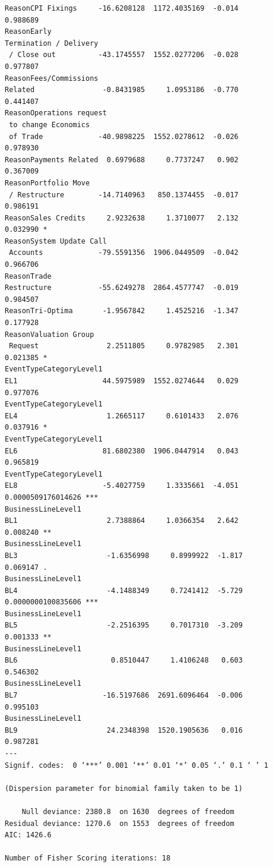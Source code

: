 \documentclass{DissertateUSU}
\begin{document}
\begin{verbatim}
ReasonCPI Fixings     -16.6208128  1172.4035169  -0.014           0.988689    
ReasonEarly 
Termination / Delivery
 / Close out          -43.1745557  1552.0277206  -0.028           0.977807    
ReasonFees/Commissions
Related                -0.8431985     1.0953186  -0.770           0.441407    
ReasonOperations request
 to change Economics
 of Trade             -40.9898225  1552.0278612  -0.026           0.978930    
ReasonPayments Related  0.6979688     0.7737247   0.902           0.367009    
ReasonPortfolio Move
 / Restructure        -14.7140963   850.1374455  -0.017           0.986191    
ReasonSales Credits     2.9232638     1.3710077   2.132           0.032990 *  
ReasonSystem Update Call
 Accounts             -79.5591356  1906.0449509  -0.042           0.966706    
ReasonTrade 
Restructure           -55.6249278  2864.4577747  -0.019           0.984507    
ReasonTri-Optima       -1.9567842     1.4525216  -1.347           0.177928    
ReasonValuation Group
 Request                2.2511805     0.9782985   2.301           0.021385 *  
EventTypeCategoryLevel1
EL1                    44.5975989  1552.0274644   0.029           0.977076    
EventTypeCategoryLevel1
EL4                     1.2665117     0.6101433   2.076           0.037916 *  
EventTypeCategoryLevel1
EL6                    81.6802380  1906.0447914   0.043           0.965819    
EventTypeCategoryLevel1
EL8                    -5.4027759     1.3335661  -4.051 0.0000509176014626 ***
BusinessLineLevel1
BL1                     2.7388864     1.0366354   2.642           0.008240 ** 
BusinessLineLevel1
BL3                     -1.6356998     0.8999922  -1.817           0.069147 .  
BusinessLineLevel1
BL4                     -4.1488349     0.7241412  -5.729 0.0000000100835606 ***
BusinessLineLevel1
BL5                     -2.2516395     0.7017310  -3.209           0.001333 ** 
BusinessLineLevel1
BL6                      0.8510447     1.4106248   0.603           0.546302    
BusinessLineLevel1
BL7                    -16.5197686  2691.6096464  -0.006           0.995103    
BusinessLineLevel1
BL9                     24.2348398  1520.1905636   0.016           0.987281    
---
Signif. codes:  0 ‘***’ 0.001 ‘**’ 0.01 ‘*’ 0.05 ‘.’ 0.1 ‘ ’ 1

(Dispersion parameter for binomial family taken to be 1)

    Null deviance: 2380.8  on 1630  degrees of freedom
Residual deviance: 1270.6  on 1553  degrees of freedom
AIC: 1426.6

Number of Fisher Scoring iterations: 18
\end{verbatim}
\end{document}
